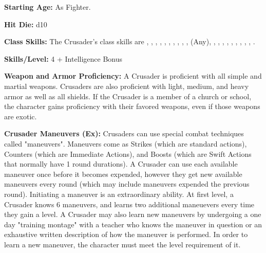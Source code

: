\textbf{Starting Age:} As Fighter.

\textbf{Hit Die:} d10

\textbf{Class Skills:} The Crusader's class skills are , , , , , , , , , ,  (Any), , , , , , , , , , .

\textbf{Skills/Level:} 4 + Intelligence Bonus

\goodbab{}
\goodfor{}
\goodref{}
\goodwil{}

\begin{extraclasstable}{}
\end{extraclasstable}

\classfeatures

\textbf{Weapon and Armor Proficiency:} A Crusader is proficient with all simple and martial weapons. Crusaders are also proficient with light, medium, and heavy armor as well as all shields. If the Crusader is a member of a church or school, the character gains proficiency with their favored weapons, even if those weapons are exotic.

\textbf{Crusader Maneuvers (Ex):} Crusaders can use special combat techniques called "maneuvers". Maneuvers come as Strikes (which are standard actions), Counters (which are Immediate Actions), and Boosts (which are Swift Actions that normally have 1 round durations). A Crusader can use each available maneuver once before it becomes expended, however they get new available maneuvers every round (which may include maneuvers expended the previous round). Initiating a maneuver is an extraordinary ability. At first level, a Crusader knows 6 maneuvers, and learns two additional maneuevers every time they gain a level. A Crusader may also learn new maneuvers by undergoing a one day "training montage" with a teacher who knows the maneuver in question or an exhaustive written description of how the maneuver is performed. In order to learn a new maneuver, the character must meet the level requirement of it.

